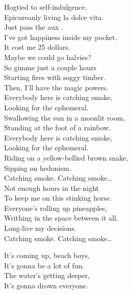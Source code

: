 Hogtied to self-indulgence. \\
Epicureanly living la dolce vita. \\
Just pass the aux . \\

I've got happiness inside my pocket. \\
It cost me 25 dollars. \\
Maybe we could go halvies? \\
So gimme just a couple hours \\
Starting fires with soggy timber. \\
Then, I'll have the magic powers. \\

Everybody here is catching smoke, \\
Looking for the ephemeral. \\
Swallowing the sun in a moonlit room, \\
Standing at the foot of a rainbow. \\
Everybody here is catching smoke, \\
Looking for the ephemeral. \\
Riding on a yellow-bellied brown snake, \\
Sipping on hedonism. \\

Catching smoke. Catching smoke… \\

Not enough hours in the night \\
To keep me on this stinking horse. \\
Everyone's rolling up pineapples, \\
Writhing in the space between it all. \\
Long-live my decisions. \\

Catching smoke. Catching smoke… \\





It's coming up, beach boys, \\
It's gonna be a lot of fun. \\
The water's getting deeper, \\
It's gonna drown everyone. \\

